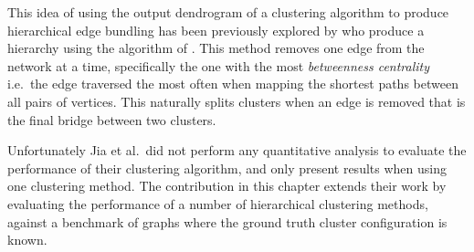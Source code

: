 This idea of using the output dendrogram of a clustering algorithm to produce hierarchical edge bundling has been previously explored by \citet{Jia2011} who produce a hierarchy using the algorithm of \citet{Girvan2002}. This method removes one edge from the network at a time, specifically the one with the most \emph{betweenness centrality} i.e.\ the edge traversed the most often when mapping the shortest paths between all pairs of vertices. This naturally splits clusters when an edge is removed that is the final bridge between two clusters.

Unfortunately Jia et al.\ did not perform any quantitative analysis to evaluate the performance of their clustering algorithm, and only present results when using one clustering method.
The contribution in this chapter extends their work by evaluating the performance of a number of hierarchical clustering methods, against a benchmark of graphs where the ground truth cluster configuration is known.

